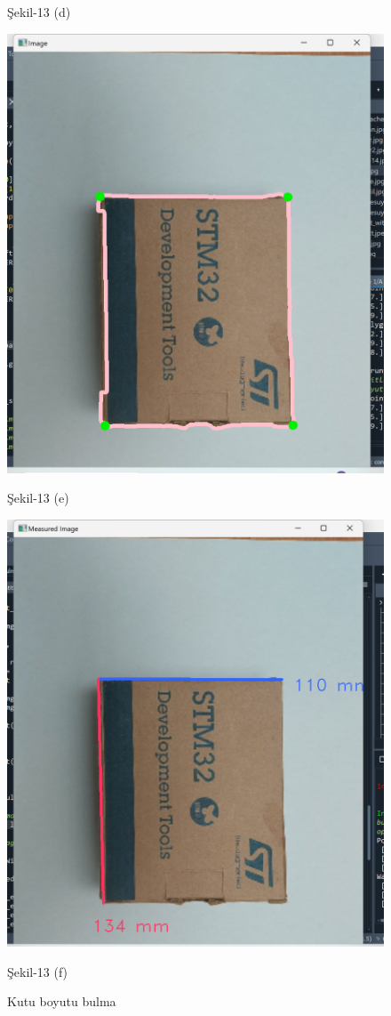 \documentclass[11pt,a4paper]{report}
\begin{document}
\begin{figure}[!h]
\begin{minipage}[t]{0.470\linewidth}
			\caption*{Şekil-13 (d)}
		\end{minipage}
			\begin{minipage}[t]{0.470\linewidth}
			\centering
			\includegraphics[width=0.65\linewidth]{nesne-1-cerceve}
			\caption*{Şekil-13 (e)}
		\end{minipage}\hfill
		\begin{minipage}[t]{0.470\linewidth}
			\centering
			\includegraphics[width=0.65\linewidth]{boyut-bulma-sonuc-1}
			\caption*{Şekil-13 (f)}
		\end{minipage}
			\caption{Kutu boyutu bulma}
	\end{figure}
	\clearpage

	
\end{document}

